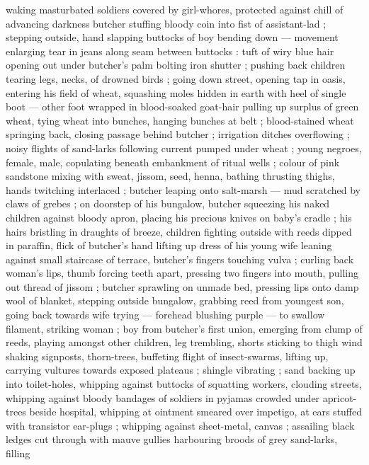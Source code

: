 waking masturbated soldiers covered by girl-whores, protected against chill of advancing darkness
{\semislash} butcher stuffing bloody coin into fist of assistant-lad ; stepping outside, hand
slapping buttocks of boy bending down --- movement enlarging tear in jeans along seam between
buttocks : tuft of wiry blue hair opening out under butcher's palm {\dashcom} bolting iron shutter ;
pushing back children tearing legs, necks, of drowned birds ; going down street, opening tap in
oasis, entering his field of wheat, squashing moles hidden in earth with %
heel of single boot --- other foot wrapped in blood-soaked goat-hair {\dashcom} pulling up surplus
of green wheat, tying wheat into bunches, hanging bunches at belt ; blood-stained wheat springing
back, closing passage behind butcher ; irrigation ditches overflowing ; noisy flights of sand-larks
following current pumped under wheat ; young negroes, female, male, copulating beneath embankment of
ritual wells ; colour of pink sandstone mixing with sweat, jissom, seed, henna, bathing thrusting
thighs, hands twitching interlaced ; butcher leaping onto salt-marsh --- mud scratched by claws of
grebes ; on doorstep of his bungalow, butcher squeezing his naked children against bloody apron,
placing his precious knives on baby's cradle ; his hairs bristling in draughts of breeze, children
fighting outside with reeds dipped in paraffin, flick of butcher's hand lifting up dress of his
young wife leaning against small staircase of terrace, butcher's fingers touching vulva ; curling
back woman's lips, thumb forcing teeth apart, pressing two fingers into mouth, pulling out thread of
jissom ; butcher sprawling on unmade bed, pressing lips onto damp wool of blanket, stepping outside
bungalow, grabbing reed from youngest son, going back towards wife trying --- forehead blushing
purple --- to swallow filament, striking woman ; boy from butcher's first union, emerging from clump
of reeds, playing amongst other children, leg trembling, shorts sticking to thigh{\td} {\slashsemi}
wind shaking signposts, thorn-trees, buffeting flight of insect-swarms, lifting up, carrying
vultures towards exposed plateaus ; shingle vibrating ; sand backing up into toilet-holes, whipping
against buttocks of squatting workers, clouding streets, whipping against bloody bandages of
soldiers in pyjamas crowded under apricot-trees beside hospital, whipping at ointment smeared over
impetigo, at ears stuffed with transistor ear-plugs ; whipping against sheet-metal, canvas ;
assailing black ledges cut through with mauve gullies harbouring broods of grey sand-larks, filling
